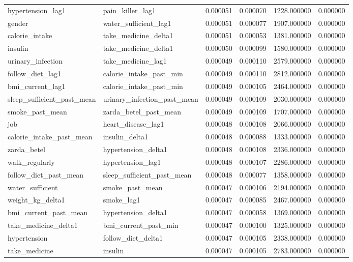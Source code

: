 \begin{longtable}{llrrrr}
hypertension\_lag1 & pain\_killer\_lag1 & 0.000051 & 0.000070 & 1228.000000 & 0.000000 \\
gender & water\_sufficient\_lag1 & 0.000051 & 0.000077 & 1907.000000 & 0.000000 \\
calorie\_intake & take\_medicine\_delta1 & 0.000051 & 0.000053 & 1381.000000 & 0.000000 \\
insulin & take\_medicine\_delta1 & 0.000050 & 0.000099 & 1580.000000 & 0.000000 \\
urinary\_infection & take\_medicine\_lag1 & 0.000049 & 0.000110 & 2579.000000 & 0.000000 \\
follow\_diet\_lag1 & calorie\_intake\_past\_min & 0.000049 & 0.000110 & 2812.000000 & 0.000000 \\
bmi\_current\_lag1 & calorie\_intake\_past\_min & 0.000049 & 0.000105 & 2464.000000 & 0.000000 \\
sleep\_sufficient\_past\_mean & urinary\_infection\_past\_mean & 0.000049 & 0.000109 & 2030.000000 & 0.000000 \\
smoke\_past\_mean & zarda\_betel\_past\_mean & 0.000049 & 0.000109 & 1707.000000 & 0.000000 \\
job & heart\_disease\_lag1 & 0.000048 & 0.000108 & 2066.000000 & 0.000000 \\
calorie\_intake\_past\_mean & insulin\_delta1 & 0.000048 & 0.000088 & 1333.000000 & 0.000000 \\
zarda\_betel & hypertension\_delta1 & 0.000048 & 0.000108 & 2336.000000 & 0.000000 \\
walk\_regularly & hypertension\_lag1 & 0.000048 & 0.000107 & 2286.000000 & 0.000000 \\
follow\_diet\_past\_mean & sleep\_sufficient\_past\_mean & 0.000048 & 0.000077 & 1358.000000 & 0.000000 \\
water\_sufficient & smoke\_past\_mean & 0.000047 & 0.000106 & 2194.000000 & 0.000000 \\
weight\_kg\_delta1 & smoke\_lag1 & 0.000047 & 0.000085 & 2467.000000 & 0.000000 \\
bmi\_current\_past\_mean & hypertension\_delta1 & 0.000047 & 0.000058 & 1369.000000 & 0.000000 \\
take\_medicine\_delta1 & bmi\_current\_past\_min & 0.000047 & 0.000100 & 1325.000000 & 0.000000 \\
hypertension & follow\_diet\_delta1 & 0.000047 & 0.000105 & 2338.000000 & 0.000000 \\
take\_medicine & insulin & 0.000047 & 0.000105 & 2783.000000 & 0.000000 \\

\end{longtable}

